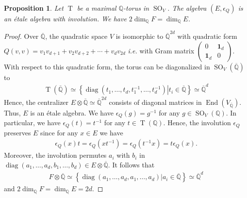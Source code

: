 \documentclass[11pt]{article} %
\newcommand{\8}{\infty}
\newcommand{\id}{\mathbf{1}}
\newcommand{\Tbf}{\operatorname{T}}
\newcommand{\Qbar}{\overline{\Q}}
\newcommand{\diag}{\operatorname{diag}}
\newcommand{\SO}{\operatorname{SO}}
\newcommand{\Q}{\mathbb{Q}}
\newcommand{\End}{\operatorname{End}}
\theoremstyle{mytheoremstyle}
\newtheorem{prop}[thm]{Proposition}
\theoremstyle{remark}
\numberwithin{equation}{section}
\begin{document}
\begin{prop}\label{converse} Let $\Tbf$ be a maximal $\Q$-torus in $\SO_V$. The algebra $(E,\epsilon_Q)$ is an \'etale algebra with involution. We have $2\dim_\Q F=\dim_\Q E$. 
\end{prop} 
\begin{proof} 
Over $\Qbar$, the quadratic space $V$ is isomorphic to $\Qbar^{2d}$ with quadratic form $Q(v,v)=v_1v_{d+1}+v_2v_{d+2}+\cdots+v_dv_{2d}$ {\em i.e.} with Gram matrix $\begin{pmatrix}
    0 & \id_d \\ \id_d & 0
\end{pmatrix}$. With respect to this quadratic form, the torus can be diagonalized in $\SO_V(\Qbar)$ to
\begin{align}
    \Tbf(\Qbar) \simeq \left \{ \left . \diag(t_1, \dots,t_d,t_1^{-1},\dots,t_d^{-1}) \right \vert t_i \in \Qbar \right \} \simeq \Qbar^d
\end{align}
 Hence, the centralizer $E \otimes \Qbar \simeq \Qbar^{2d}$ consists of diagonal matrices in $\End(V_{\Qbar})$. Thus, $E$ is an \'etale algebra. We have $\epsilon_Q(g)=g^{-1}$ for any $g \in \SO_V(\Q)$.  In particular, we have $\epsilon_Q(t)=t^{-1}$ for any $t \in \Tbf(\Q)$. Hence, the involution $\epsilon_Q$ preserves $E$ since for any $x \in E$ we have
 \begin{align}
     \epsilon_Q(x)t=\epsilon_Q(xt^{-1})=\epsilon_Q(t^{-1}x)=t\epsilon_Q(x).
 \end{align}
Moreover, the involution permutes $a_i$ with $b_i$ in $\diag(a_1, \dots,a_d,b_1,\dots,b_d) \in E \otimes \Qbar$. It follows that
\begin{align}
    F \otimes \Qbar \simeq \left \{ \left . \diag(a_1, \dots,a_d,a_1,\dots,a_d) \right \vert a_i \in \Qbar \right \} \simeq \Qbar^d
\end{align}
and $2\dim_\Q F=\dim_\Q E=2d$.
\end{proof}
\end{document}

